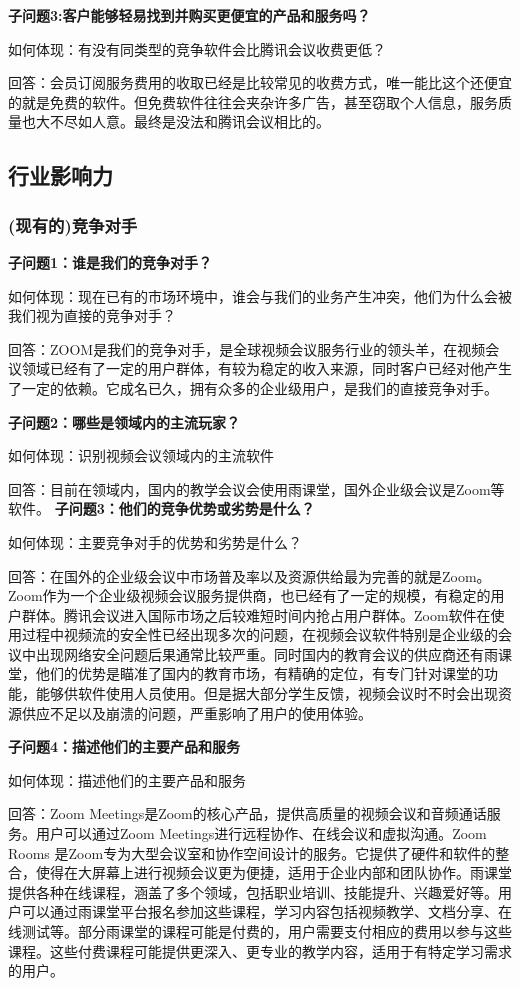 \documentclass[a4paper,12pt]{article}
\begin{document}
    \textbf{子问题3:客户能够轻易找到并购买更便宜的产品和服务吗？}

    如何体现：有没有同类型的竞争软件会⽐腾讯会议收费更低？

    回答：会员订阅服务费用的收取已经是⽐较常⻅的收费⽅式，唯⼀能⽐这个还便宜的就是免费的软件。但免费软件往往会夹杂许多⼴告，甚⾄窃取个⼈信息，服务质量也大不尽如人意。最终是没法和腾讯会议相⽐的。
    
    \subsection{行业影响力}
    \subsubsection{(现有的)竞争对手}
    \textbf{子问题1：谁是我们的竞争对手？}

    如何体现：现在已有的市场环境中，谁会与我们的业务产⽣冲突，他们为什么会被我们视为直接的竞争对⼿？

    回答：ZOOM是我们的竞争对⼿，是全球视频会议服务⾏业的领头⽺，在视频会议领域已经有了⼀定的⽤户群体，有较为稳定的收⼊来源，同时客户已经对他产⽣了⼀定的依赖。它成名已久，拥有众多的企业级⽤户，是我们的直接竞争对⼿。
    

    \textbf{子问题2：哪些是领域内的主流玩家？}

    如何体现：识别视频会议领域内的主流软件

    回答：⽬前在领域内，国内的教学会议会使⽤⾬课堂，国外企业级会议是Zoom等软件。
    \textbf{子问题3：他们的竞争优势或劣势是什么？}

    如何体现：主要竞争对⼿的优势和劣势是什么？

    回答：在国外的企业级会议中市场普及率以及资源供给最为完善的就是Zoom。Zoom作为⼀个企业级视频会议服务提供商，也已经有了⼀定的规模，有稳定的⽤户群体。腾讯会议进⼊国际市场之后较难短时间内抢占⽤户群体。Zoom软件在使⽤过程中视频流的安全性已经出现多次的问题，在视频会议软件特别是企业级的会议中出现⽹络安全问题后果通常⽐较严重。同时国内的教育会议的供应商还有⾬课堂，他们的优势是瞄准了国内的教育市场，有精确的定位，有专⻔针对课堂的功能，能够供软件使⽤⼈员使⽤。但是据⼤部分学⽣反馈，视频会议时不时会出现资源供应不⾜以及崩溃的问题，严重影响了⽤户的使⽤体验。

    \textbf{子问题4：描述他们的主要产品和服务}

    如何体现：描述他们的主要产品和服务

    回答：Zoom Meetings是Zoom的核心产品，提供高质量的视频会议和音频通话服务。用户可以通过Zoom Meetings进行远程协作、在线会议和虚拟沟通。Zoom Rooms 是Zoom专为大型会议室和协作空间设计的服务。它提供了硬件和软件的整合，使得在大屏幕上进行视频会议更为便捷，适用于企业内部和团队协作。雨课堂提供各种在线课程，涵盖了多个领域，包括职业培训、技能提升、兴趣爱好等。用户可以通过雨课堂平台报名参加这些课程，学习内容包括视频教学、文档分享、在线测试等。部分雨课堂的课程可能是付费的，用户需要支付相应的费用以参与这些课程。这些付费课程可能提供更深入、更专业的教学内容，适用于有特定学习需求的用户。
\end{document}
